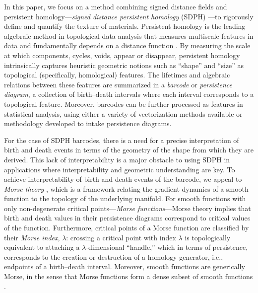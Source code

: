 \documentclass[11pt]{article}
\theoremstyle{plain}
\theoremstyle{definition}
\theoremstyle{remark}
\begin{document}
In this paper, we focus on a method combining signed distance fields and persistent homology---\emph{signed distance persistent homology} (SDPH) \citep{delgado-friedrichs_morse_2014, delgado-friedrichs_skeletonization_2015, herring_topological_2019, moon_statistical_2019}---to rigorously define and quantify the texture of materials. Persistent homology is the leading algebraic method in topological data analysis that measures multiscale features in data and fundamentally depends on a distance function \citep{edelsbrunner_persistent_2008,ghrist_barcodes_2008,carlsson_topology_2009}.  By measuring the scale at which components, cycles, voids, appear or disappear, persistent homology intrinsically captures heuristic geometric notions such as ``shape'' and ``size'' as topological (specifically, homological) features. The lifetimes and algebraic relations between these features are summarized in a \emph{barcode} or \textit{persistence diagram}, a collection of birth--death intervals where each interval corresponds to a topological feature. Moreover, barcodes can be further processed as features in statistical analysis, using either a variety of vectorization methods available or methodology developed to intake persistence diagrams.

For the case of SDPH barcodes, there is a need for a precise interpretation of birth and death events in terms of the geometry of the shape from which they are derived. This lack of interpretability is a major obstacle to using SDPH in applications where interpretability and geometric understanding are key. To achieve interpretability of birth and death events of the barcode, we appeal to \emph{Morse theory} \citep{milnor_morse_1963}, which is a framework relating the gradient dynamics of a smooth function to the topology of the underlying manifold.  For smooth functions with only non-degenerate critical points---\emph{Morse functions}---Morse theory implies that birth and death values in their persistence diagrams correspond to critical values of the function. Furthermore, critical points of a Morse function are classified by their \emph{Morse index}, $\lambda$: crossing a critical point with index $\lambda$ is topologically equivalent to attaching a $\lambda$-dimensional ``handle,'' which in terms of persistence, corresponds to the  creation or destruction of a homology generator, i.e., endpoints of a birth--death interval. Moreover, smooth functions are generically Morse, in the sense that Morse functions form a dense subset of smooth functions \cite[Chapter 6]{hirsch_differential_1976}.
\end{document}
